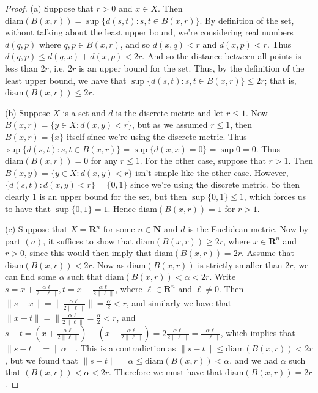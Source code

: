\documentclass[9pt,reqno]{amsart}
\theoremstyle{definition}
\newcommand{\rr}{\mathbf R}
\newcommand{\nn}{\mathbf N}
\begin{document}
\begin{proof}
	(a) Suppose that $r>0$ and $x \in X$. Then $\text{diam} (B(x,r)) = \sup \{d(s,t) \colon s,t \in B(x,r) \}$. By definition of the set, without talking about the least upper bound, we're considering real numbers $d(q,p)$ where $q,p \in B (x,r)$, and so $d(x,q) <r$ and $d(x, p ) <r$. Thus $d(q,p) \leq d(q,x) + d(x, p) < 2r$. And so the distance between all points is less than $2r$, i.e. $2r$ is an upper bound for the set. Thus, by the definition of the least upper bound, we have that $\sup \{d(s,t) \colon s,t \in B(x,r) \} \leq 2r$; that is, $\text{diam} (B(x,r)) \leq 2r$.
	
	(b) Suppose $X$ is a set and $d$ is the discrete metric and let $ r \leq 1$. Now $B (x,r) = \{ y \in X \colon d(x,y) < r \}$, but as we assumed $ r \leq 1$, then $B (x,r) = \{ x \}$ itself since we're using the discrete metric. Thus $\sup \{ d(s,t) \colon s,t \in B(x,r) \} = \sup \{ d(x,x) = 0 \} = \sup {0} = 0$. Thus $\text{diam} (B(x,r)) =0$ for any $r \leq 1$. For the other case, suppose that $r>1$. Then $B(x,y) = \{ y \in X \colon d(x,y) < r \}$ isn't simple like the other case. However, $\{d(s,t) \colon d(x,y) <r\} = \{0,1 \}$ since we're using the discrete metric. So then clearly $1$ is an upper bound for the set, but then $\sup \{0,1 \} \leq 1$, which forces us to have that $\sup \{0, 1\} = 1$. Hence $\text{diam} (B(x,r)) = 1$ for $r>1$. 
	
	(c) Suppose that $X = \rr^n$ for some $n \in \nn$ and $d$ is the Euclidean metric. Now by part $(a)$, it suffices to show that $\text{diam}(B(x,r)) \geq 2r$, where $x \in \rr^n$ and $r>0$, since this would then imply that $\text{diam} (B(x,r)) = 2r$. Assume that $\text{diam} (B(x,r)) <2r$. Now as $\text{diam} (B(x,r))$ is strictly smaller than $2r$, we can find some $\alpha$ such that $\text{diam} (B(x,r)) < \alpha < 2r$. Write $s = x+ \frac{\alpha  \ell}{2\|\ell\|}, t = x- \frac{\alpha \ell }{2 \|\ell \|}$, where $\ell \in \rr^n$ and $\ell \neq 0$. Then $\|s-x \| = \| \frac{\alpha  \ell}{2\|\ell\|} \| = \frac{\alpha}{2} < r$, and similarly we have that $\|x-t \| = \|\frac{\alpha \ell}{2 \| \ell \|} = \frac{\alpha}{2} <r$, and $s-t = (x+\frac{\alpha  \ell}{2\|\ell\|}) - (x-\frac{\alpha  \ell}{2\|\ell\|}) = 2 \frac{\alpha  \ell}{2\|\ell\|} = \frac{\alpha \ell}{\| \ell \|}$, which implies that $\|s -t\| = \|\alpha \|$. This is a contradiction as $\|s-t\| \leq \text{diam} (B(x,r))<2r$, but we found that $\|s-t\| = \alpha \leq \text{diam} (B(x,r)) < \alpha$, and we had $\alpha$ such that $(B(x,r)) < \alpha < 2r$. Therefore we must have that $\text{diam}(B(x,r)) =2r$. 
	\end{proof}
\end{document}
